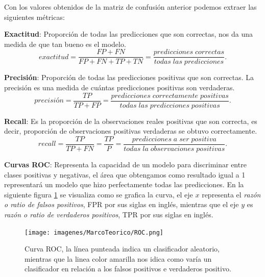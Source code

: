 Con los valores obtenidos de la matriz de confusión anterior podemos extraer las siguientes métricas:

\textbf{Exactitud}: Proporción de todas las predicciones que son correctas, nos da una medida de que tan bueno es el modelo.
\begin{equation}
exactitud = \frac{FP+FN}{FP+FN+TP+TN}=\frac{predicciones\;correctas}{todas\;las\;predicciones}.
\end{equation}

\textbf{Precisión}: Proporción de todas las predicciones positivas que son correctas. La precisión es una medida de cuántas predicciones positivas son verdaderas.
\begin{equation}
precisión=\frac{TP}{TP+FP}= \frac{predicciones\;correctamente\;positivas}{todas\;las\;predicciones\;positivas}.
\end{equation}

\textbf{Recall}: Es la proporción de la observaciones reales positivas que son correcta, es decir, proporción de observaciones positivas verdaderas se obtuvo correctamente.
\begin{equation}
recall = \frac{TP}{TP+FN} = \frac{TP}{P} = \frac{predicciones\;a\;ser\;positiva}{todas\;la\;observaciones\;positivas} .
\end{equation}

\textbf{Curvas ROC}: Representa la capacidad de un modelo para discriminar entre clases positivas y negativas, el área que obtengamos  como resultado igual a 1 representará un modelo que hizo perfectamente todas las predicciones. En la siguiente figura \ref{Fig: roc} se visualiza como se grafica la curva, el eje $x$ representa el \textit{razón o ratio de falsos positivos}, FPR por sus siglas en inglés, mientras que el eje $y$ es \textit{razón o ratio de verdaderos positivos}, TPR por sus siglas en inglés.

\begin{figure}[H]
 \centering
  \texttt{[image: imagenes/MarcoTeorico/ROC.png]}
  \caption{Curva ROC, la línea punteada indica un clasificador aleatorio, mientras que la linea color amarilla nos idica como varía un clasificador en relación a los falsos positivos e verdaderos positivo.} \label{Fig: roc}
\end{figure}

